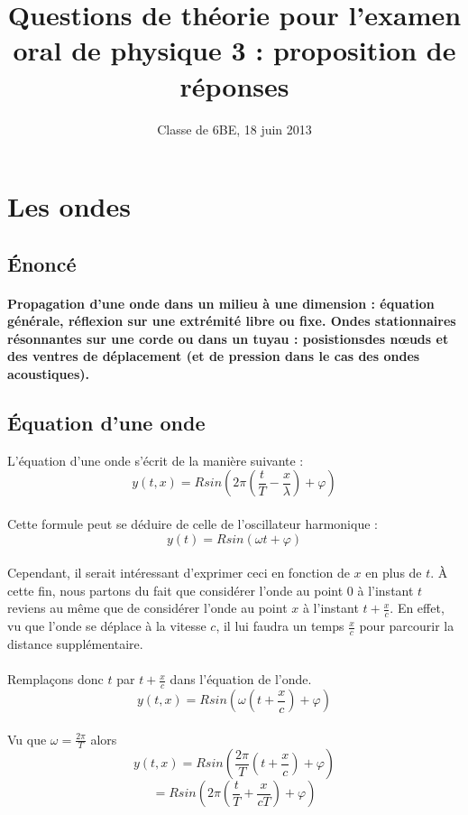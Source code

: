 \documentclass[a4paper]{article}
\title{Questions de théorie pour l'examen oral de physique 3 : proposition de réponses}
\date{Classe de 6BE, 18 juin 2013}
\author{}
\begin{document}
\maketitle
\section{Les ondes}
\subsection{Énoncé}
\paragraph{}\textbf{Propagation d'une onde dans un milieu à une dimension : équation générale, réflexion sur une extrémité libre ou fixe. Ondes stationnaires résonnantes sur une corde ou dans un tuyau : posistionsdes nœuds et des ventres de déplacement (et de pression dans le cas des ondes acoustiques).}
\subsection{Équation d'une onde}
L'équation d'une onde s'écrit de la manière suivante :
\[y(t,x)=Rsin\left(2\pi\left(\frac{t}{T}-\frac{x}{\lambda}\right)+\varphi\right)\]
\paragraph{}Cette formule peut se déduire de celle de l'oscillateur harmonique :
\[y(t)=Rsin(\omega t+\varphi)\]
\paragraph{}Cependant, il serait intéressant d'exprimer ceci en fonction de $x$ en plus de $t$. À cette fin, nous partons du fait que considérer l'onde au point $0$ à l'instant $t$ reviens au même que de considérer l'onde au point $x$ à l'instant $t+\frac{x}{c}$. En effet, vu que l'onde se déplace à la vitesse $c$, il lui faudra un temps $\frac{x}{c}$ pour parcourir la distance supplémentaire.
\paragraph{}Remplaçons donc $t$ par $t+\frac{x}{c}$ dans l'équation de l'onde.
\[y(t,x)=Rsin\left(\omega \left(t+\frac{x}{c}\right)+\varphi\right)\]
\paragraph{}Vu que $\omega=\frac{2\pi}{T}$ alors
\[y(t,x)=Rsin\left(\frac{2\pi}{T} \left(t+\frac{x}{c}\right)+\varphi\right)\]
\[=Rsin\left(2\pi \left(\frac{t}{T}+\frac{x}{cT}\right)+\varphi\right)\]
\end{document}
